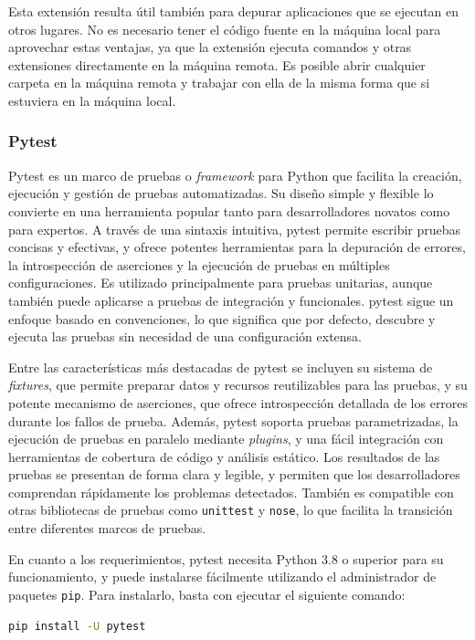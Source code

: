 Esta extensión resulta útil también para depurar aplicaciones que se ejecutan en otros lugares. No es necesario tener el código fuente en la máquina local para aprovechar estas ventajas, ya que la extensión ejecuta comandos y otras extensiones directamente en la máquina remota. Es posible abrir cualquier carpeta en la máquina remota y trabajar con ella de la misma forma que si estuviera en la máquina local.

\subsubsection{Pytest}

Pytest \citep{pytest} es un marco de pruebas o \textit{framework} para Python que facilita la creación, ejecución y gestión de pruebas automatizadas. Su diseño simple y flexible lo convierte en una herramienta popular tanto para desarrolladores novatos como para expertos. A través de una sintaxis intuitiva, pytest permite escribir pruebas concisas y efectivas, y ofrece potentes herramientas para la depuración de errores, la introspección de aserciones y la ejecución de pruebas en múltiples configuraciones. Es utilizado principalmente para pruebas unitarias, aunque también puede aplicarse a pruebas de integración y funcionales. pytest sigue un enfoque basado en convenciones, lo que significa que por defecto, descubre y ejecuta las pruebas sin necesidad de una configuración extensa.

Entre las características más destacadas de pytest se incluyen su sistema de \textit{fixtures}, que permite preparar datos y recursos reutilizables para las pruebas, y su potente mecanismo de aserciones, que ofrece introspección detallada de los errores durante los fallos de prueba. Además, pytest soporta pruebas parametrizadas, la ejecución de pruebas en paralelo mediante \textit{plugins}, y una fácil integración con herramientas de cobertura de código y análisis estático. Los resultados de las pruebas se presentan de forma clara y legible, y permiten que los desarrolladores comprendan rápidamente los problemas detectados. También es compatible con otras bibliotecas de pruebas como \texttt{unittest} y \texttt{nose}, lo que facilita la transición entre diferentes marcos de pruebas.

En cuanto a los requerimientos, pytest necesita Python 3.8 o superior para su funcionamiento, y puede instalarse fácilmente utilizando el administrador de paquetes \texttt{pip}. Para instalarlo, basta con ejecutar el siguiente comando: 
\begin{lstlisting}[language=bash]
pip install -U pytest
\end{lstlisting}

